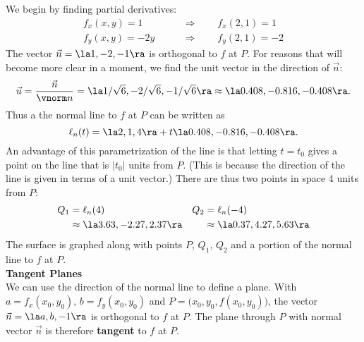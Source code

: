 {We begin by finding partial derivatives:
\begin{align*}
f_x(x,y)  =1  \qquad &\Rightarrow \qquad f_x(2,1) = 1\\
f_y(x,y) = -2y \qquad &\Rightarrow \qquad  f_y(2,1) = -2
\end{align*}
The vector $\vec n=\la 1,-2,-1\ra$ is orthogonal to $f$ at $P$. For reasons that will become more clear in a moment, we find the unit vector in the direction of $\vec n$:
\[
\vec u = \frac{\vec n}{\vnorm n} = \la 1/\sqrt{6},-2/\sqrt{6},-1/\sqrt{6}\ra \approx \la 0.408,-0.816,-0.408\ra.
\]
Thus a the normal line to $f$ at $P$ can be written as
\[
\ell_n(t) = \la 2,1,4\ra + t\la  0.408,-0.816,-0.408 \ra.
\]
An advantage of this parametrization of the line is that letting $t=t_0$ gives a point on the line that is $\lvert t_0\rvert$ units from $P$. (This is because the direction of the line is given in terms of a unit vector.) There are thus two points in space 4 units from $P$:
\begin{align*}
Q_1 &= \ell_n(4) & Q_2 &= \ell_n(-4) \\
  &\approx \la 3.63, -2.27, 2.37\ra & & \approx\la 0.37, 4.27, 5.63\ra
	\end{align*}
The surface is graphed along with points $P$, $Q_1$, $Q_2$ and a portion of the normal line to $f$ at $P$.
}\\

\noindent\textbf{\large Tangent Planes}\\

We can use the direction of the normal line to define a plane. With $a=f_x(x_0,y_0)$, $b=f_y(x_0,y_0)$ and $P = \big(x_0,y_0,f(x_0,y_0)\big)$, the vector $\vec n=\la a,b,-1\ra$ is orthogonal to $f$ at $P$. The plane through $P$ with normal vector $\vec n$ is therefore \textbf{tangent} to $f$ at $P$.

